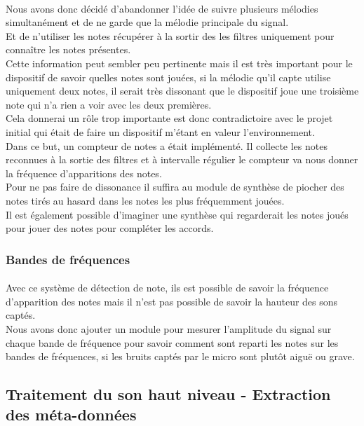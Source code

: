 \documentclass[a4paper, titlepage, oneside, 12pt]{article}%
\begin{document}
\paragraph{}
Nous avons donc décidé d'abandonner l'idée de suivre plusieurs mélodies simultanément et de ne garde que la mélodie principale du signal. \\
Et de n’utiliser les notes récupérer à la sortir des les filtres uniquement pour connaître les notes présentes.\\
Cette information peut sembler peu pertinente mais il est très important pour le dispositif de savoir quelles notes sont jouées, si la mélodie qu'il capte utilise uniquement deux notes, il serait très dissonant que le dispositif joue une troisième note qui n'a rien a voir avec les deux premières.\\ Cela donnerai un rôle trop importante est donc contradictoire avec le projet initial qui était de faire un dispositif m’étant en valeur l’environnement.\\
Dans ce but, un compteur de notes a était implémenté. Il collecte les notes reconnues à la sortie des filtres et à intervalle régulier le compteur va nous donner la fréquence d’apparitions des notes.\\
Pour ne pas faire de dissonance il suffira au module de synthèse de piocher des notes tirés au hasard dans les notes les plus fréquemment jouées.\\
Il est également possible d'imaginer une synthèse qui regarderait les notes joués pour jouer des notes pour compléter les accords.

\subsubsection{Bandes de fréquences}
\paragraph{}
Avec ce système de détection de note, ils est possible de savoir la fréquence d'apparition des notes mais il n'est pas possible de savoir la hauteur des sons captés.\\
Nous avons donc ajouter un module pour mesurer l'amplitude du signal sur chaque bande de fréquence pour savoir comment sont reparti les notes sur les bandes de fréquences, si les bruits captés par le micro sont plutôt aiguë ou grave.

\subsection{Traitement du son haut niveau - Extraction des méta-données}
\end{document}
